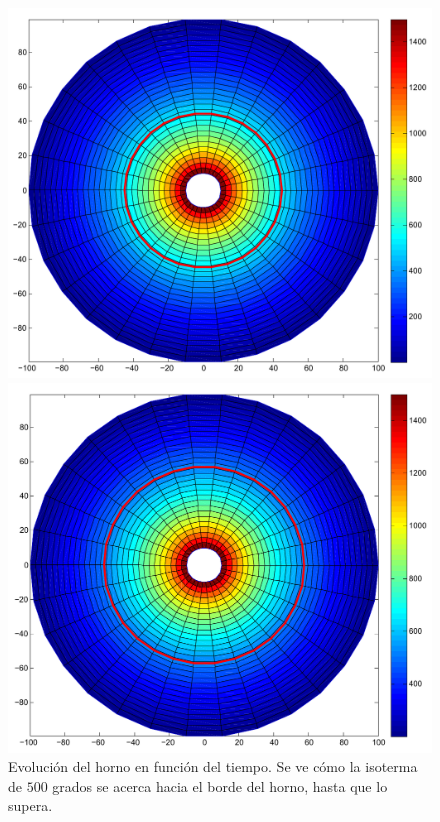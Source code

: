 \begin{figure}[!htb]
    \caption{Evolución del horno en función del tiempo. Se ve cómo la isoterma de $500$ grados se acerca hacia el borde del horno, hasta que lo supera.}
    \label{exp2-hornos}
\centering
{}

  \includegraphics[width=1\textwidth]{figures/exp2-1.pdf}

\endminipage\hfill
{}

  \includegraphics[width=1\textwidth]{figures/exp2-2.pdf}


\end{figure}
